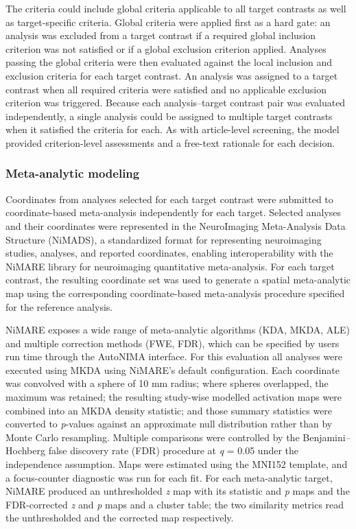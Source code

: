 The criteria could include global criteria applicable to all target contrasts as well as target-specific criteria. Global criteria were applied first as a hard gate: an analysis was excluded from a target contrast if a required global inclusion criterion was not satisfied or if a global exclusion criterion applied. Analyses passing the global criteria were then evaluated against the local inclusion and exclusion criteria for each target contrast. An analysis was assigned to a target contrast when all required criteria were satisfied and no applicable exclusion criterion was triggered. Because each analysis--target contrast pair was evaluated independently, a single analysis could be assigned to multiple target contrasts when it satisfied the criteria for each. As with article-level screening, the model provided criterion-level assessments and a free-text rationale for each decision.

\subsubsection{Meta-analytic modeling}

Coordinates from analyses selected for each target contrast were submitted to coordinate-based meta-analysis independently for each target. Selected analyses and their coordinates were represented in the NeuroImaging Meta-Analysis Data Structure (NiMADS), a standardized format for representing neuroimaging studies, analyses, and reported coordinates, enabling interoperability with the NiMARE library for neuroimaging quantitative meta-analysis. For each target contrast, the resulting coordinate set was used to generate a spatial meta-analytic map using the corresponding coordinate-based meta-analysis procedure specified for the reference analysis. \cite{Salo2023-fb}

NiMARE exposes a wide range of meta-analytic algorithms (KDA, MKDA, ALE) and multiple correction methods (FWE, FDR), which can be specified by users run time through the AutoNIMA interface. For this evaluation all analyses were executed using MKDA using NiMARE's default configuration. Each coordinate was convolved with a sphere of 10 mm radius; where spheres overlapped, the maximum was retained; the resulting study-wise modelled activation maps were combined into an MKDA density statistic; and those summary statistics were converted to \emph{p}-values against an approximate null distribution rather than by Monte Carlo resampling. Multiple comparisons were controlled by the Benjamini--Hochberg false discovery rate (FDR) procedure at \emph{q} = 0.05 under the independence assumption. Maps were estimated using the MNI152 template, and a focus-counter diagnostic was run for each fit. For each meta-analytic target, NiMARE produced an unthresholded \emph{z} map with its statistic and \emph{p} maps and the FDR-corrected \emph{z} and \emph{p} maps and a cluster table; the two similarity metrics read the unthresholded and the corrected map respectively.

